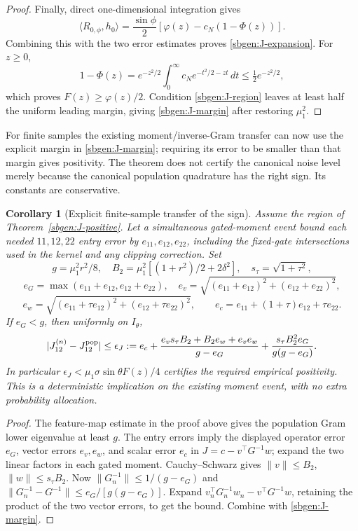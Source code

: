 \documentclass{article} %
\theoremstyle{plain}
\newtheorem{corollary}[theorem]{Corollary}
\theoremstyle{definition}
\theoremstyle{remark}
\begin{document}
\begin{proof}
Finally, direct one-dimensional integration gives
\[
 \langle R_{0,\phi},h_0\rangle
 =\frac{\sin\phi}{2}
     [\varphi(z)-c_N(1-\Phi(z))].
\]
Combining this with the two error estimates proves
\eqref{sbgen:J-expansion}. For $z\ge0$,
\[
 1-\Phi(z)
 =e^{-z^2/2}\int_0^\infty c_Ne^{-t^2/2-zt}\,dt
 \le\tfrac12 e^{-z^2/2},
\]
which proves $F(z)\ge\varphi(z)/2$.
Condition \eqref{sbgen:J-region} leaves at least half the uniform
leading margin, giving \eqref{sbgen:J-margin} after restoring $\mu_1^2$.
\end{proof}

For finite samples the existing moment/inverse-Gram transfer can now
use the explicit margin in \eqref{sbgen:J-margin}; requiring its error
to be smaller than that margin gives positivity. The theorem does not
certify the canonical noise level merely because the canonical
population quadrature has the right sign. Its constants are conservative.

\begin{corollary}[Explicit finite-sample transfer of the sign]
\label{sbgen:J-finite}
Assume the region of Theorem~\ref{sbgen:J-positive}. Let a simultaneous
gated-moment event bound each needed $11,12,22$ entry error by
$e_{11},e_{12},e_{22}$, including the fixed-gate intersections used in
the kernel and any clipping correction. Set
\[
 g=\mu_1^2r^2/8,\quad
 B_2=\mu_1^2[(1+r^2)/2+2\delta^2],\quad s_\tau=\sqrt{1+\tau^2},
\]
\[
 e_G=\max(e_{11}+e_{12},e_{12}+e_{22}),\quad
 e_v=\sqrt{(e_{11}+e_{12})^2+(e_{12}+e_{22})^2},
\]
\[
 e_w=\sqrt{(e_{11}+\tau e_{12})^2+(e_{12}+\tau e_{22})^2},
 \qquad e_c=e_{11}+(1+\tau)e_{12}+\tau e_{22}.
\]
If $e_G<g$, then uniformly on $I_\theta$,
\[
 |J_{12}^{(n)}-J_{12}^{\rm pop}|\le
 \epsilon_J:=e_c+
 \frac{e_v s_\tau B_2+B_2e_w+e_ve_w}{g-e_G}
 +\frac{s_\tau B_2^2e_G}{g(g-e_G)}.
\]
In particular $\epsilon_J<\mu_1\sigma\sin\theta F(z)/4$ certifies
the required empirical positivity. This is a deterministic implication
on the existing moment event, with no extra probability allocation.
\end{corollary}
\begin{proof}
The feature-map estimate in the proof above gives the population Gram
lower eigenvalue at least $g$. The entry errors imply the displayed
operator error $e_G$, vector errors $e_v,e_w$, and scalar error $e_c$
in $J=c-v^\top G^{-1}w$; expand the two linear factors in each gated
moment. Cauchy--Schwarz gives $\|v\|\le B_2$,
$\|w\|\le s_\tau B_2$.
Now $\|G_n^{-1}\|\le1/(g-e_G)$ and
$\|G_n^{-1}-G^{-1}\|\le e_G/[g(g-e_G)]$.
Expand $v_n^\top G_n^{-1}w_n-v^\top G^{-1}w$, retaining the product
of the two vector errors, to get the bound. Combine with
\eqref{sbgen:J-margin}.
\end{proof}
\end{document}
